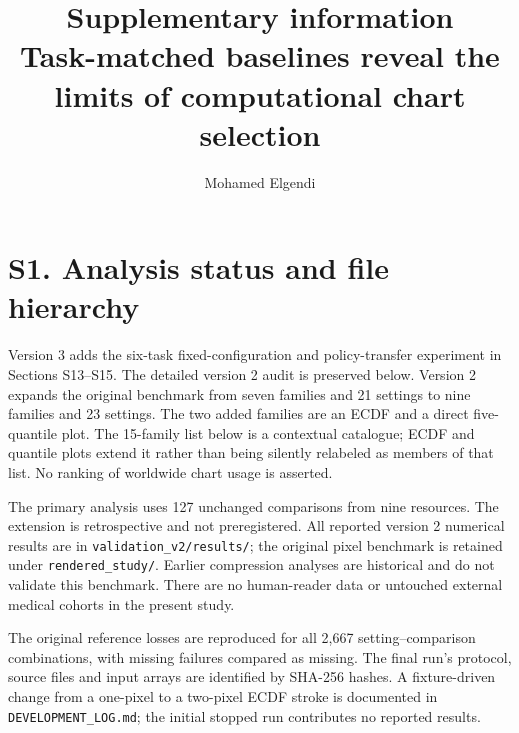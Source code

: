 \documentclass[10pt]{article}
\title{Supplementary information\\Task-matched baselines reveal the limits of computational chart selection}
\author{Mohamed Elgendi}\date{}
\begin{document}
\maketitle
\section*{S1. Analysis status and file hierarchy}
Version 3 adds the six-task fixed-configuration and policy-transfer experiment in Sections S13--S15. The detailed version 2 audit is preserved below. Version 2 expands the original benchmark from seven families and 21 settings to nine families and 23 settings. The two added families are an ECDF and a direct five-quantile plot. The 15-family list below is a contextual catalogue; ECDF and quantile plots extend it rather than being silently relabeled as members of that list. No ranking of worldwide chart usage is asserted.

The primary analysis uses 127 unchanged comparisons from nine resources. The extension is retrospective and not preregistered. All reported version 2 numerical results are in \texttt{validation\_v2/results/}; the original pixel benchmark is retained under \texttt{rendered\_study/}. Earlier compression analyses are historical and do not validate this benchmark. There are no human-reader data or untouched external medical cohorts in the present study.

The original reference losses are reproduced for all 2,667 setting--comparison combinations, with missing failures compared as missing. The final run's protocol, source files and input arrays are identified by SHA-256 hashes. A fixture-driven change from a one-pixel to a two-pixel ECDF stroke is documented in \texttt{DEVELOPMENT\_LOG.md}; the initial stopped run contributes no reported results.
\end{document}
